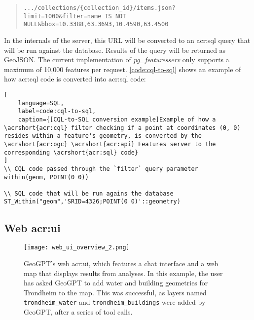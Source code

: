 \begin{quote}
    \texttt{.../collections/\{collection\_id\}/items.json?limit=1000\&filter=name IS NOT NULL\&bbox=10.3388,63.3693,10.4590,63.4500}
\end{quote}

In the internals of the server, this URL will be converted to an \acrshort{acr:sql} query that will be run against the database. Results of the query will be returned as GeoJSON. The current implementation of \textit{pg\_featuresserv} only supports a maximum of 10,000 features per request. \autoref{code:cql-to-sql} shows an example of how \acrshort{acr:cql} code is converted into \acrshort{acr:sql} code:

\begin{lstlisting}[
    language=SQL,
    label=code:cql-to-sql,
    caption={[CQL-to-SQL conversion example]Example of how a \acrshort{acr:cql} filter checking if a point at coordinates (0, 0) resides within a feature's geometry, is converted by the \acrshort{acr:ogc} \acrshort{acr:api} Features server to the corresponding \acrshort{acr:sql} code} 
]
\\ CQL code passed through the `filter` query parameter
within(geom, POINT(0 0))

\\ SQL code that will be run agains the database
ST_Within("geom",'SRID=4326;POINT(0 0)'::geometry)
\end{lstlisting}


\subsection[Web UI]{Web \acrshort{acr:ui}}
\label{subsec:web-ui}

\begin{figure}[h]
    \centering
    \texttt{[image: web\_ui\_overview\_2.png]}
    \caption[GeoGPT's web UI]{GeoGPT's web \acrshort{acr:ui}, which features a chat interface and a web map that displays results from analyses. In this example, the user has asked GeoGPT to add water and building geometries for Trondheim to the map. This was successful, as layers named \texttt{trondheim\_water} and \texttt{trondheim\_buildings} were added by GeoGPT, after a series of tool calls.}
    \label{fig:web-ui}
\end{figure}

